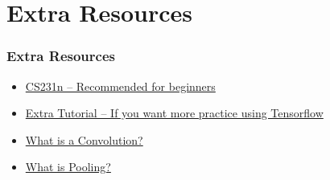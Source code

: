 \documentclass{beamer}
\begin{document}
\section{Extra Resources}
\begin{frame}
  \frametitle{Extra Resources}
  \begin{itemize}
  \item \href{http://cs231n.stanford.edu/}{CS231n -- Recommended for beginners}
  \item \href{https://github.com/Hvass-Labs/TensorFlow-Tutorials}{Extra Tutorial -- If you want more practice using Tensorflow}
  \item \href{http://ufldl.stanford.edu/tutorial/supervised/FeatureExtractionUsingConvolution/}{What is a Convolution?}
  \item \href{http://ufldl.stanford.edu/tutorial/supervised/Pooling/}{What is Pooling?}
  \end{itemize}
\end{frame}
\end{document}
